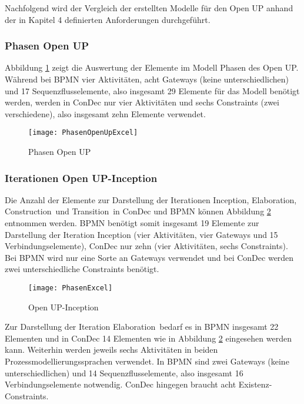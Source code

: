 Nachfolgend wird der Vergleich der erstellten Modelle für den Open UP anhand der in Kapitel 4 definierten Anforderungen durchgeführt.

\subsubsection {Phasen Open UP}


Abbildung \ref{fig:PhasenOpenUpExcel} zeigt die Auswertung der Elemente im Modell \grqq Phasen des Open UP\grqq. Während bei BPMN vier Aktivitäten, acht Gateways (keine unterschiedlichen) und 17 Sequenzflusselemente, also insgesamt 29 Elemente für das Modell benötigt werden, werden in ConDec nur vier Aktivitäten und sechs Constraints (zwei verschiedene), also insgesamt zehn Elemente verwendet.

\begin{figure}[htp]
\begin{center}
  \texttt{[image: PhasenOpenUpExcel]} %
  \caption{Phasen Open UP}
  \label{fig:PhasenOpenUpExcel}
\end{center}
\end{figure}



\subsubsection {Iterationen Open UP-Inception}

Die Anzahl der Elemente zur Darstellung der Iterationen \grqq Inception\grqq, \grqq Elaboration\grqq, \grqq Construction\grqq \ und \grqq Transition\grqq \ in ConDec und BPMN können Abbildung \ref{fig:PhasenExcel} entnommen werden. BPMN benötigt somit insgesamt 19 Elemente zur Darstellung der Iteration Inception (vier Aktivitäten, vier Gateways und 15 Verbindungselemente), ConDec nur zehn (vier Aktivitäten, sechs Constraints). Bei BPMN wird nur eine Sorte an Gateways verwendet und bei ConDec werden zwei unterschiedliche Constraints benötigt.\newline
\begin{figure}[htp]
\begin{center}
  \texttt{[image: PhasenExcel]} %
  \caption{Open UP-Inception}
  \label{fig:PhasenExcel}
\end{center}
\end{figure}



Zur Darstellung der Iteration \grqq Elaboration\grqq \ bedarf es in BPMN insgesamt 22 Elementen und in ConDec 14 Elementen wie in Abbildung \ref{fig:PhasenExcel} eingesehen werden kann. Weiterhin werden jeweils sechs Aktivitäten in beiden Prozessmodellierungssprachen verwendet. In BPMN sind zwei Gateways (keine unterschiedlichen) und 14 Sequenzflusselemente, also insgesamt 16 Verbindungselemente notwendig. ConDec hingegen braucht acht Existenz-Constraints. \newline

